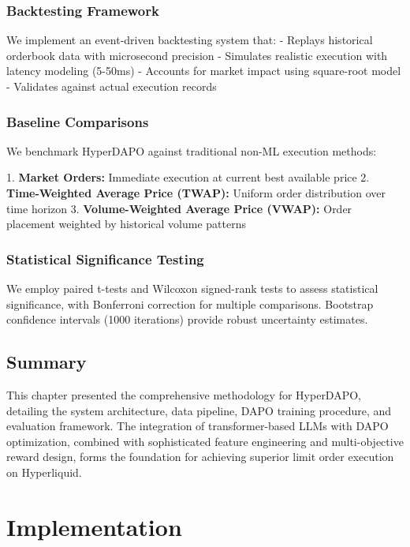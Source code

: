 \documentclass{report}
\begin{document}
\subsection{Backtesting Framework}

We implement an event-driven backtesting system that:
- Replays historical orderbook data with microsecond precision
- Simulates realistic execution with latency modeling (5-50ms)
- Accounts for market impact using square-root model
- Validates against actual execution records

\subsection{Baseline Comparisons}

We benchmark HyperDAPO against traditional non-ML execution methods:

1. \textbf{Market Orders:} Immediate execution at current best available price
2. \textbf{Time-Weighted Average Price (TWAP):} Uniform order distribution over time horizon
3. \textbf{Volume-Weighted Average Price (VWAP):} Order placement weighted by historical volume patterns

\subsection{Statistical Significance Testing}

We employ paired t-tests and Wilcoxon signed-rank tests to assess statistical significance, with Bonferroni correction for multiple comparisons. Bootstrap confidence intervals (1000 iterations) provide robust uncertainty estimates.

\section{Summary}

This chapter presented the comprehensive methodology for HyperDAPO, detailing the system architecture, data pipeline, DAPO training procedure, and evaluation framework. The integration of transformer-based LLMs with DAPO optimization, combined with sophisticated feature engineering and multi-objective reward design, forms the foundation for achieving superior limit order execution on Hyperliquid.

\chapter{Implementation}
\label{chapter:implementation}
\end{document}
